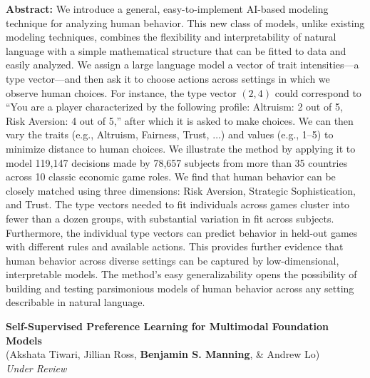 \documentclass[margin,line,pifont,palatino,courier, 9pt]{res}
\begin{document}
\begin{resume}
\begin{singlespace}
\footnotesize
\textbf{Abstract:}
We introduce a general, easy-to-implement AI-based modeling technique for analyzing human behavior.
This new class of models, unlike existing modeling techniques, combines the flexibility and interpretability of natural language with a simple mathematical structure that can be fitted to data and easily analyzed.
We assign a large language model a vector of trait intensities---a type vector---and then ask it to choose actions across settings in which we observe human choices.
For instance, the type vector $(2,4)$ could correspond to ``You are a player characterized by the following profile: Altruism: 2 out of 5, Risk Aversion: 4 out of 5,'' after which it is asked to make choices.
We can then vary the traits (e.g., Altruism, Fairness, Trust, $\dots$) and values (e.g., 1--5) to minimize distance to human choices.
We illustrate the method by applying it to model 119,147 decisions made by 78,657 subjects from more than 35 countries across 10 classic economic game roles.
We find that human behavior can be closely matched using three dimensions: Risk Aversion, Strategic Sophistication, and Trust.
The type vectors needed to fit individuals across games cluster into fewer than a dozen groups, with substantial variation in fit across subjects.
Furthermore, the individual type vectors can predict behavior in held-out games with different rules and available actions.
This provides further evidence that human behavior across diverse settings can be captured by low-dimensional, interpretable models.
The method's easy generalizability opens the possibility of building and testing parsimonious models of human behavior across any setting describable in natural language.
\end{singlespace}

{\bf Self-Supervised Preference Learning for Multimodal Foundation Models}\\
(Akshata Tiwari\footnotemark[\value{footnote}], Jillian Ross, \textbf{Benjamin S. Manning}, \& Andrew Lo)\\
\textit{Under Review}


\end{resume}
\end{document}
